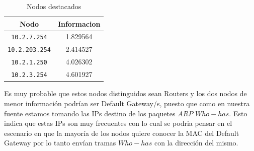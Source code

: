     \begin{table}[ht]\begin{center}
      \begin{tabular}{|c|c|}
      \hline
      \textbf{Nodo} & \textbf{Informacion} \\ \hline
      \texttt{10.2.7.254}& 1.829564 \\ \hline
      \texttt{10.2.203.254}& 2.414527 \\ \hline
      \texttt{10.2.1.250}& 4.026302 \\ \hline
      \texttt{10.2.3.254}& 4.601927 \\ \hline
      \end{tabular}
      \caption{Nodos destacados}
      \label{Nodos-destacados}
    \end{center}\end{table}

Es muy probable que estos nodos distinguidos sean Routers y los dos nodos de menor información podrían ser Default Gateway/s, puesto que como en nuestra fuente estamos tomando las IPs destino de los paquetes $ARP$ $Who-has$. Esto indica que estas IPs son muy frecuentes con lo cual se podria pensar en el escenario en que la mayoría de los nodos quiere conocer la MAC del Default Gateway por lo tanto envían tramas $Who-has$ con la dirección del mismo. 